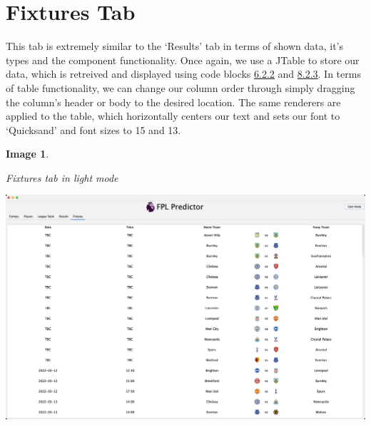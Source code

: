 \documentclass[12pt, a4paper, oneside]{book}
\newtheorem{image}[theorem]{Image}
\numberwithin{equation}{section}
\begin{document}
\section{Fixtures Tab}\label{sec:6.9}

This tab is extremely similar to the `Results' tab in terms of shown data, it's types and the component functionality. Once again, we use a JTable to store our data, which is retreived and displayed using code blocks \hyperref[Defining a DefaultTableModel]{6.2.2} and \hyperref[Creating a DataTable object]{8.2.3}. In terms of table functionality, we can change our column order through simply dragging the column's header or body to the desired location. The same renderers are applied to the table, which horizontally centers our text and sets our font to `Quicksand' and font sizes to 15 and 13.

\begin{image} \label{Fixtures tab in light mode}

  Fixtures tab in light mode

  \vspace{0.5cm}

  \centerline{\includegraphics[width=1\textwidth]{images/gui/fixtures-tab/light.png}}

\end{image}
\end{document}
